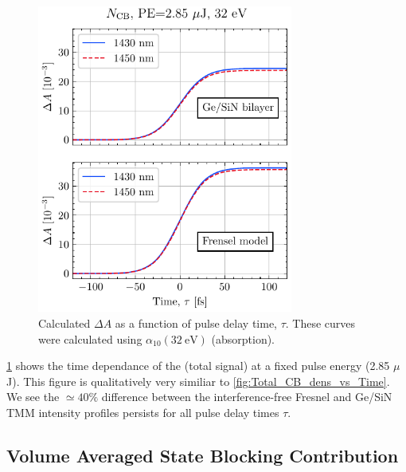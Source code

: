 \begin{figure}
	\centering
	\includegraphics[width=0.75\textwidth]{figures/chap4/FVA_Total_CB_dens_vs_T.pdf}
	\caption{Calculated $\Delta A$ as a function of pulse delay time, $\tau$. These curves were calculated using $\alpha_{10}(32 \ \textrm{eV})$ (absorption).}
	\label{fig:FVA_Total_CB_dens_vs_T}
\end{figure}

\cref{fig:FVA_Total_CB_dens_vs_T} shows the time dependance of the (total signal) at a fixed pulse energy (2.85 $\mu$J). This figure is qualitatively very similiar to \cref{fig:Total_CB_dens_vs_Time}. We see the $\simeq 40\%$ difference between the interference-free Fresnel and Ge/SiN TMM intensity profiles persists for all pulse delay times $\tau$.


\subsection{Volume Averaged State Blocking Contribution}
\label{sec:VA_SB_contribution}


